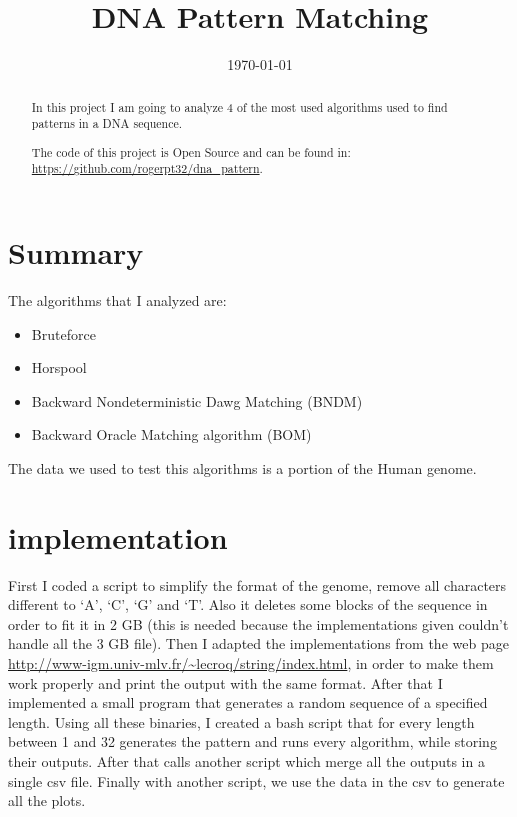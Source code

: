 \documentclass[conference,a4paper]{IEEEtran}
\begin{document}
\title{DNA Pattern Matching}

\author{
}

\date{\today}

\maketitle

\begin{abstract}
In this project I am going to analyze 4 of the most used algorithms used to find patterns in a DNA sequence.

The code of this project is Open Source and can be found in: \url{https://github.com/rogerpt32/dna_pattern}.
\end{abstract}

\section{Summary}
The algorithms that I analyzed are:
\begin{itemize}
    \item Bruteforce
    \item Horspool
    \item Backward Nondeterministic Dawg Matching (BNDM)
    \item Backward Oracle Matching algorithm (BOM)
\end{itemize}
The data we used to test this algorithms is a portion of the Human genome.
\section{implementation}
First I coded a script to simplify the format of the genome, remove all characters different to `A', `C', `G' and `T'. Also it deletes some blocks of the sequence in order to fit it in 2 GB (this is needed because the implementations given couldn't handle all the 3 GB file).
Then I adapted the implementations from the web page \url{http://www-igm.univ-mlv.fr/~lecroq/string/index.html}, in order to make them work properly and print the output with the same format. After that I implemented a small program that generates a random sequence of a specified length. Using all these binaries, I created a bash script that for every length between 1 and 32 generates the pattern and runs every algorithm, while storing their outputs. After that calls another script which merge all the outputs in a single csv file. Finally with another script, we use the data in the csv to generate all the plots.
\end{document}
